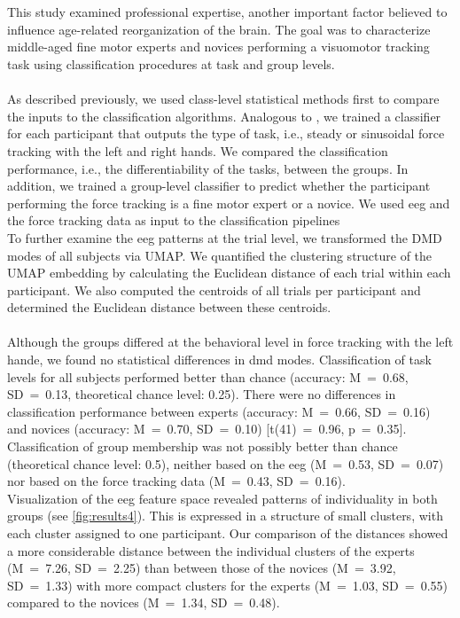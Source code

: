 \hyperref[pub:paperIV]{}\\
\\
This study examined professional expertise, another important factor believed to influence age-related reorganization of the brain. The goal was to characterize middle-aged fine motor experts and novices performing a visuomotor tracking task using classification procedures at task and group levels.\\
\\
As described previously, we used class-level statistical methods first to compare the inputs to the classification algorithms. Analogous to , we trained a classifier for each participant that outputs the type of task, i.e., steady or sinusoidal force tracking with the left and right hands. We compared the classification performance, i.e., the differentiability of the tasks, between the groups. In addition, we trained a group-level classifier to predict whether the participant performing the force tracking is a fine motor expert or a novice. We used \gls{eeg} and the force tracking data as input to the classification pipelines\\
To further examine the \gls{eeg} patterns at the trial level, we transformed the DMD modes of all subjects via UMAP. We quantified the clustering structure of the UMAP embedding by calculating the Euclidean distance of each trial within each participant. We also computed the centroids of all trials per participant and determined the Euclidean distance between these centroids.\\
\\
Although the groups differed at the behavioral level in force tracking with the left hande, we found no statistical differences in \gls{dmd} modes. Classification of task levels for all subjects performed better than chance (accuracy: M~=~0.68, SD~=~0.13, theoretical chance level: 0.25). There were no differences in classification performance between experts (accuracy: M~=~0.66, SD~=~0.16) and novices (accuracy: M~=~0.70, SD~=~0.10) [t(41)~=~0.96, p~=~0.35].\\
Classification of group membership was not possibly better than chance (theoretical chance level: 0.5), neither based on the \gls{eeg} (M~=~0.53, SD~=~0.07) nor based on the force tracking data (M~=~0.43, SD~=~0.16).\\
Visualization of the \gls{eeg} feature space revealed patterns of individuality in both groups (see \autoref{fig:results4}). This is expressed in a structure of small clusters, with each cluster assigned to one participant. Our comparison of the distances showed a more considerable distance between the individual clusters of the experts (M~=~7.26, SD~=~2.25) than between those of the novices (M~=~3.92, SD~=~1.33) with more compact clusters for the experts (M~=~1.03, SD~=~0.55) compared to the novices (M~=~1.34, SD~=~0.48).\\

